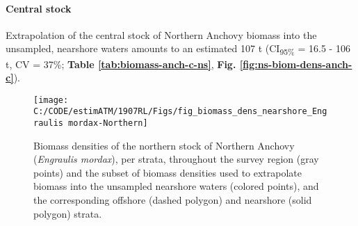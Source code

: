 \documentclass[]{article}
\let\oldparagraph\paragraph
\renewcommand{\paragraph}[1]{\oldparagraph{#1}\mbox{}}
\begin{document}
\hypertarget{appendix-nearshore-biomass-anchovy-c}{%
\paragraph{Central stock}\label{appendix-nearshore-biomass-anchovy-c}}

Extrapolation of the central stock of Northern Anchovy biomass into the unsampled, nearshore waters amounts to an estimated 107 t (CI\textsubscript{95\%} = 16.5 - 106 t, CV = 37\%; \textbf{Table \ref{tab:biomass-anch-c-ns}}, \textbf{Fig. \ref{fig:ns-biom-dens-anch-c}}).



\begin{table}[!h]

\caption{\label{tab:biomass-anch-c-ns}Biomass estimates (metric tons, t) and their precision (upper and lower 95\% confidence intervals, CI\textsubscript{95\%}; standard deviation, SD; and coefficient of variation, CV) for the central stock of Northern Anchovy (\emph{Engraulis mordax}) in the unsampled, nearshore waters. Stratum areas are nmi\textsuperscript{2}.}
\centering
{}
\end{table}

\newpage



\begin{figure}[H]

{\centering \texttt{[image: C:/CODE/estimATM/1907RL/Figs/fig\_biomass\_dens\_nearshore\_Engraulis mordax-Northern]} 

}

\caption{Biomass densities of the northern stock of Northern Anchovy (\emph{Engraulis mordax}), per strata, throughout the survey region (gray points) and the subset of biomass densities used to extrapolate biomass into the unsampled nearshore waters (colored points), and the corresponding offshore (dashed polygon) and nearshore (solid polygon) strata.}\label{fig:ns-biom-dens-anch-n}
\end{figure}
\end{document}
